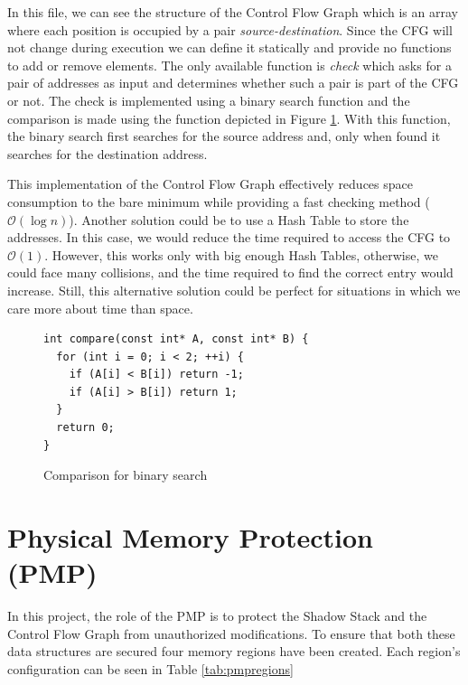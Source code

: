 In this file, we can see the structure of the Control Flow Graph which is an
array where each position is occupied by a pair \textit{source-destination}.
Since the CFG will not change during execution we can define it statically and
provide no functions to add or remove elements. The only available function is \textit{check}
which asks for a pair of addresses as input and determines whether such a pair
is part of the CFG or not. The check is implemented using a binary search function
and the comparison is made using the function depicted in Figure \ref{fig:binsearch}.
With this function, the binary search first searches for the source address and,
only when found it searches for the destination address.

This implementation of the Control Flow Graph effectively reduces space
consumption to the bare minimum while providing a fast checking method ($\mathcal{O}
(\log{n})$). Another solution could be to use a Hash Table to store the addresses.
In this case, we would reduce the time required to access the CFG to $\mathcal{O}
(1)$. However, this works only with big enough Hash Tables, otherwise, we could face
many collisions, and the time required to find the correct entry would increase.
Still, this alternative solution could be perfect for situations in which we
care more about time than space.

\begin{figure}[htbp]
  \centering
  \begin{lstlisting}[style=CStyle]
int compare(const int* A, const int* B) {
  for (int i = 0; i < 2; ++i) {
    if (A[i] < B[i]) return -1;
    if (A[i] > B[i]) return 1;
  }
  return 0;
}
 \end{lstlisting}
  \caption{Comparison for binary search}
  \label{fig:binsearch}
\end{figure}

\section{Physical Memory Protection (PMP)}
\label{sec:project_pmp}

In this project, the role of the PMP is to protect the Shadow Stack and the Control
Flow Graph from unauthorized modifications. To ensure that both these data
structures are secured four memory regions have been created. Each region's configuration
can be seen in Table \ref{tab:pmpregions}

